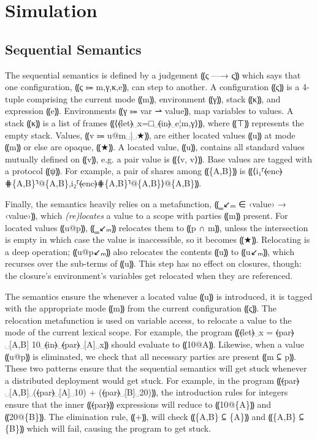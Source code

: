 \section{Simulation}
\label{sec:lam-mpc-simulation}

\subsection{Sequential Semantics}


The sequential semantics is defined by a judgement ⸨ς —→ ς⸩ which says that
one configuration, ⸨ς ⩴ m,γ,κ,e⸩, can step to another. A configuration
⸨ς⸩ is a 4-tuple comprising the current mode ⸨m⸩, environment ⸨γ⸩, stack
⸨κ⸩, and expression ⸨e⸩. Environments ⸨γ ⩴ var ⇀ value⸩, map variables to
values. A stack ⸨κ⸩ is a list of frames ⸨⟨⦑let⦒␣x=□␣⦑in⦒␣e¦m,γ⟩⸩, where
⸨⊤⸩ represents the empty stack. Values, ⸨v ⩴ u@m␣|␣★⸩, are either located
values ⸨u⸩ at mode ⸨m⸩ or else are opaque, ⸨★⸩. A located value, ⸨u⸩,
contains all standard values mutually defined on ⸨v⸩, e.g. a pair value is ⸨⟨v, v⟩⸩.
Base values are tagged with a protocol ⸨ψ⸩. For example, a
pair of shares among ⸨\{A,B\}⸩ is ⸨⟨i₁⸢⦑enc⦒⋕\{A,B\}⸣@\{A,B\},i₂⸢⦑enc⦒⋕\{A,B\}⸣@\{A,B\}⟩@\{A,B\}⸩.

Finally, the semantics heavily relies on a metafunction, ⸨‗↙ₘ ∈ ‹value› → ‹value›⸩, which \emph{(re)locates} a
value to a scope with parties ⸨m⸩ present. For located values ⸨u@p⸩, ⸨‗↙ₘ⸩
relocates them to ⸨p ∩ m⸩, unless the intersection is empty in which case the
value is inaccessible, so it becomes ⸨★⸩. Relocating is a deep operation;
⸨u@p↙ₘ⸩ also relocates the contents ⸨u⸩ to ⸨u↙ₘ⸩, which recurses over
the sub-terms of ⸨u⸩. This step has no effect on closures, though: the closure's
environment's variables get relocated when they are referenced.

The semantics ensure the whenever a located value ⸨u⸩ is introduced, it is tagged with
the appropriate mode ⸨m⸩ from the current configuration ⸨ς⸩. The relocation metafunction
is used on variable access, to relocate a value to the mode of the current lexical scope.
For example, the program ⸨⦑let⦒␣x = ⦑par⦒␣[A,B] 10␣⦑in⦒␣⦑par⦒␣[A]␣x⸩ should evaluate to
⸨10@{A}⸩. Likewise, when a value ⸨u@p⸩ is eliminated, we check that all necessary parties
are present ⸨m ⊆ p⸩. These two patterns ensure that the sequential semantics will get stuck
whenever a distributed deployment would get stuck. For example, in the program
⸨⦑par⦒␣[A,B]␣(⦑par⦒␣[A]␣10) + (⦑par⦒␣[B]␣20)⸩, the introduction rules for integers ensure that
the inner ⸨⦑par⦒⸩ expressions will reduce to ⸨10@\{A\}⸩ and ⸨20@\{B\}⸩. The elimination rule, ⸨+⸩,
will check ⸨\{A,B\} ⊆ \{A\}⸩ and ⸨\{A,B\} ⊆ \{B\}⸩ which will fail, causing the program to get stuck.

